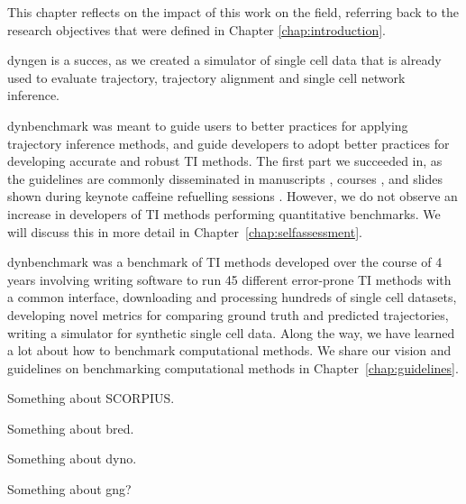 
	
This chapter reflects on the impact of this work on the field, referring back to the research objectives that were defined in Chapter \ref{chap:introduction}. 
	
dyngen is a succes, as we created a simulator of single cell data that is already used to evaluate trajectory\cite{saelens_comparisonsinglecelltrajectory_2019}, trajectory alignment\cite{vandenberge_trajectorybaseddifferentialexpression_2019} and single cell network inference\cite{pratapa_benchmarkingalgorithmsgene_2019}.

dynbenchmark was meant to guide users to better practices for applying trajectory inference methods, and guide developers to adopt better practices for developing accurate and robust TI methods. The first part we succeeded in, as the guidelines are commonly disseminated in manuscripts \cite{lafzi_tutorialguidelinesexperimental_2018,luecken_currentbestpractices_2019}, courses \cite{kiselev_analysissinglecell_2019,martens_analysissinglecell_2019}, and slides shown during keynote caffeine refuelling sessions \cite{hemberg_coffeebreakanalysis_2019}. However, we do not observe an increase in developers of TI methods performing quantitative benchmarks. We will discuss this in more detail in Chapter~\ref{chap:selfassessment}.

dynbenchmark was a benchmark of TI methods developed over the course of 4 years involving writing software to run 45 different error-prone TI methods with a common interface, downloading and processing hundreds of single cell datasets, developing novel metrics for comparing ground truth and predicted trajectories, writing a simulator for synthetic single cell data. Along the way, we have learned a lot about how to benchmark computational methods. We share our vision and guidelines on benchmarking computational methods in Chapter~\ref{chap:guidelines}.

Something about SCORPIUS.

Something about bred.

Something about dyno.

Something about gng?



